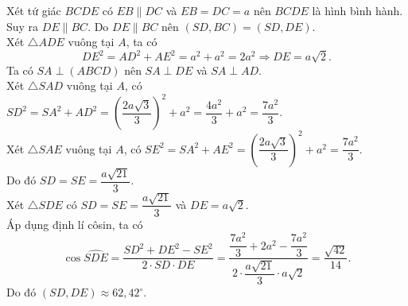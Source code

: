 \begin{ex}
{\begin{itemchoice}
			Xét tứ giác  $BCDE$ có $EB \parallel DC$ và $EB=DC=a$ nên $BCDE$ là hình bình hành.\\
			Suy ra $DE \parallel BC$. 
			\itemch Do $DE \parallel BC$ nên $\left(SD, BC\right)=\left(SD, DE\right)$.\\ 
			Xét $\triangle ADE$  vuông tại $A$, ta có
			$$DE^2=AD^2+AE^2=a^2+a^2=2a^2 \Rightarrow  DE=a\sqrt{2}.$$
			Ta có $SA \perp  (ABCD)$ nên $SA \perp DE$ và $SA \perp AD$.\\
			Xét $\triangle SAD$ vuông tại $A$, có  $SD^2=SA^2+AD^2=\left(\dfrac{2a\sqrt{3}}{3}\right)^2+a^2=\dfrac{4a^2}{3}+a^2=\dfrac{7a^2}{3}.$\\
			Xét $\triangle SAE$ vuông tại $A$,  có $SE^2=SA^2+AE^2=\left(\dfrac{2a\sqrt{3}}{3}\right)^2+a^2=\dfrac{7a^2}{3}.$\\
			 Do đó $SD=SE=\dfrac{a\sqrt{21}}{3}$.\\
			 Xét $\triangle SDE$ có $SD=SE=\dfrac{a\sqrt{21}}{3}$ và $DE=a\sqrt{2}$.\\
			 Áp dụng định lí côsin, ta có
			$$\cos\widehat{SDE}=\dfrac{SD^2+DE^2-SE^2}{2\cdot SD\cdot DE}=\dfrac{\dfrac{7a^2}{3}+2a^2-\dfrac{7a^2}{3}}{2\cdot\dfrac{a\sqrt{21}}{3}\cdot a\sqrt{2}}=\dfrac{\sqrt{42}}{14}.$$ 
			Do đó $\left(SD, DE\right) \approx 62{,}42^\circ$. 
		\end{itemchoice}
	} 
\end{ex}

